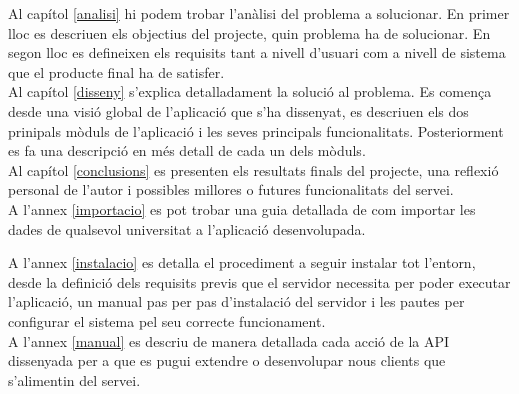 Al capítol \ref{analisi} hi podem trobar l'anàlisi del problema a solucionar. En primer lloc es descriuen els objectius del projecte, quin problema ha de solucionar. En segon lloc es defineixen els requisits tant a nivell d'usuari com a nivell de sistema que el producte final ha de satisfer.\\

Al capítol \ref{disseny} s'explica detalladament la solució al problema. Es comença desde una visió global de l'aplicació que s'ha dissenyat, es descriuen els dos prinipals mòduls de l'aplicació i les seves principals funcionalitats. Posteriorment es fa una descripció en més detall de cada un dels mòduls.\\

Al capítol \ref{conclusions} es presenten els resultats finals del projecte, una reflexió personal de l'autor i possibles millores o futures funcionalitats del servei. \\

A l'annex \ref{importacio} es pot trobar una guia detallada de com importar les dades de qualsevol universitat a l'aplicació desenvolupada.

A l'annex \ref{instalacio} es detalla el procediment a seguir instalar tot l'entorn, desde la definició dels requisits previs que el servidor necessita per poder executar l'aplicació, un manual pas per pas d'instalació del servidor i les pautes per configurar el sistema pel seu correcte funcionament.\\

A l'annex \ref{manual} es descriu de manera detallada cada acció de la API dissenyada per a que es pugui extendre o desenvolupar nous clients que s'alimentin del servei. \\

